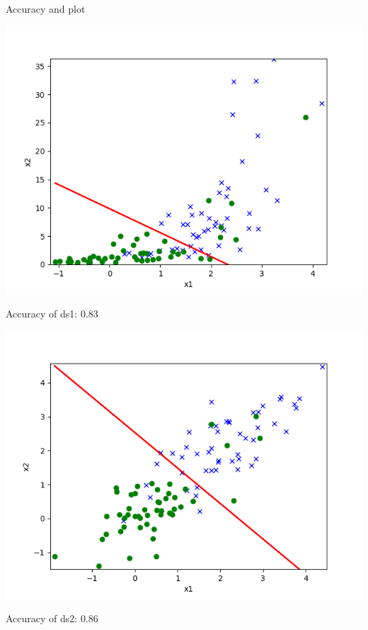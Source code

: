 \begin{answer}
Accuracy and plot

\includegraphics[width=1\textwidth]{linearclass/logreg_plot_1_valid.png}

Accuracy of ds1: 0.83

\includegraphics[width=1\textwidth]{linearclass/logreg_plot_2_valid.png}

Accuracy of ds2: 0.86

\end{answer}
